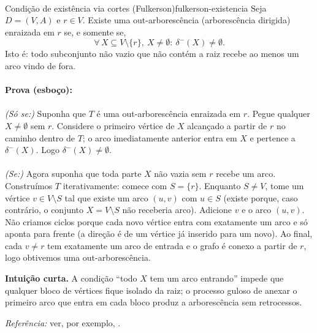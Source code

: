 \documentclass[12pt,a4paper]{article}
\begin{document}
\paragraph{}
\begin{teobox}{Condição de existência via cortes (Fulkerson)}{fulkerson-existencia}
Seja $D=(V,A)$ e $r\in V$. Existe uma out-arborescência (arborescência dirigida) enraizada em $r$ se, e somente se,
\[
\forall\, X\subseteq V\setminus\{r\},\ X\neq\emptyset:\  \delta^-(X)\neq\emptyset.
\]
Isto é: todo subconjunto não vazio que não contém a raiz recebe ao menos um arco vindo de fora.

\paragraph{}
	\textbf{Prova (esboço):} 

\paragraph{}
\emph{(Só se:)} Suponha que $T$ é uma out-arborescência enraizada em $r$. Pegue qualquer $X\neq\emptyset$ sem $r$. Considere o primeiro vértice de $X$ alcançado a partir de $r$ no caminho dentro de $T$; o arco imediatamente anterior entra em $X$ e pertence a $\delta^-(X)$. Logo $\delta^-(X)\neq\emptyset$.

\paragraph{}
\emph{(Se:)} Agora suponha que toda parte $X$ não vazia sem $r$ recebe um arco. Construímos $T$ iterativamente: comece com $S=\{r\}$. Enquanto $S\neq V$, tome um vértice $v\in V\setminus S$ tal que existe um arco $(u,v)$ com $u\in S$ (existe porque, caso contrário, o conjunto $X=V\setminus S$ não receberia arco). Adicione $v$ e o arco $(u,v)$. Não criamos ciclos porque cada novo vértice entra com exatamente um arco e só aponta para frente (a direção é de um vértice já inserido para um novo). Ao final, cada $v\neq r$ tem exatamente um arco de entrada e o grafo é conexo a partir de $r$, logo obtivemos uma out-arborescência.

\medskip
	\textbf{Intuição curta.} A condição “todo $X$ tem um arco entrando” impede que qualquer bloco de vértices fique isolado da raiz; o processo guloso de anexar o primeiro arco que entra em cada bloco produz a arborescência sem retrocessos.

\medskip
\emph{Referência:} ver, por exemplo, \cite{schrijver2003comb}.
\label{thm:fulkerson-cut-arborescencia}
\end{teobox}
\end{document}
